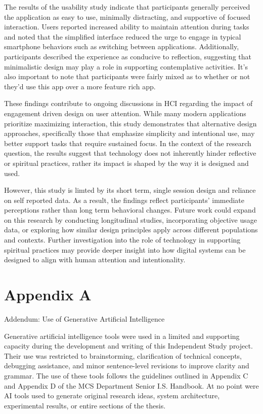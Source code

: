 \documentclass[12pt]{article}
\begin{document}
The results of the usability study indicate that participants generally perceived the application as easy to use, minimally distracting, and supportive of focused interaction. Users reported increased ability to maintain attention during tasks and noted that the simplified interface reduced the urge to engage in typical smartphone behaviors such as switching between applications. Additionally, participants described the experience as conducive to reflection, suggesting that minimalistic design may play a role in supporting contemplative activities. It's also important to note that participants were fairly mixed as to whether or not they'd use this app over a more feature rich app. 

These findings contribute to ongoing discussions in HCI regarding the impact of engagement driven design on user attention. While many modern applications prioritize maximizing interaction, this study demonstrates that alternative design approaches, specifically those that emphasize simplicity and intentional use, may better support tasks that require sustained focus. In the context of the research question, the results suggest that technology does not inherently hinder reflective or spiritual practices, rather its impact is shaped by the way it is designed and used.

However, this study is limted by its short term, single session design and reliance on self reported data. As a result, the findings reflect participants' immediate perceptions rather than long term behavioral changes. Future work could expand on this research by conducting longitudinal studies, incorporating objective usage data, or exploring how similar design principles apply across different populations and contexts. Further investigation into the role of technology in supporting spiritual practices may provide deeper insight into how digital systems can be designed to align with human attention and intentionality. 




\section{Appendix A}
Addendum: Use of Generative Artificial Intelligence

Generative artificial intelligence tools were used in a limited and supporting capacity
during the development and writing of this Independent Study project. Their use was
restricted to brainstorming, clarification of technical concepts, debugging assistance, and
minor sentence-level revisions to improve clarity and grammar. The use of these tools
follows the guidelines outlined in Appendix C and Appendix D of the MCS Department
Senior I.S. Handbook. At no point were AI tools used to generate original research ideas,
system architecture, experimental results, or entire sections of the thesis.
\end{document}

